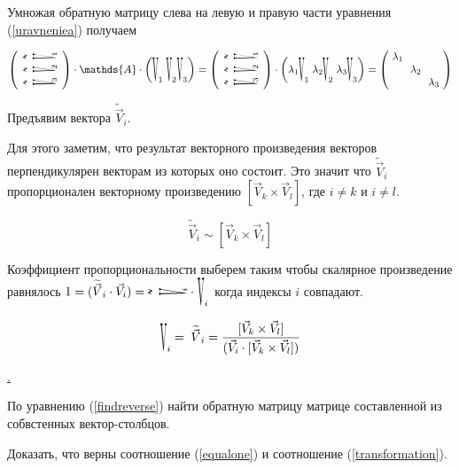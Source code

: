 \documentclass[a4paper,12pt]{article}
\begin{document}
Умножая обратную матрицу слева на левую и правую части уравнения (\ref{uravneniea}) получаем

\begin{equation}
\left(
\begin{array}{l}
        \rotatebox{90}{\raisebox{-0.25cm}{\scalebox{0.75}[3.1]{$\widetilde{V}$}$_{\!\!1}$}} \\
        \rotatebox{90}{\raisebox{-0.25cm}{\scalebox{0.75}[3.1]{$\widetilde{V}$}$_{\!\!2}$}} \\
        \rotatebox{90}{\raisebox{-0.25cm}{\scalebox{0.75}[3.1]{$\widetilde{V}$}$_{\!\!3}$}}
\end{array}
\right)
\cdot 
\mathds{A}\cdot\left(\raisebox{-0.25cm}{\scalebox{0.75}[3.1]{V}$_1$} \vectorcol{V}{2} \vectorcol{V}{3}\right) = 
\left(
\begin{array}{l}
        \rotatebox{90}{\raisebox{-0.25cm}{\scalebox{0.75}[3.1]{$\widetilde{V}$}$_{\!\!1}$}} \\
        \rotatebox{90}{\raisebox{-0.25cm}{\scalebox{0.75}[3.1]{$\widetilde{V}$}$_{\!\!2}$}} \\
        \rotatebox{90}{\raisebox{-0.25cm}{\scalebox{0.75}[3.1]{$\widetilde{V}$}$_{\!\!3}$}}
\end{array}
\right)
\cdot
\left(\lambda_1\!\!\vectorcol{V}{1}\lambda_2\!\!\vectorcol{V}{2}\lambda_3\!\!\vectorcol{V}{3}\right)
=
\left(
\begin{array}{ccc}
	\!\lambda_1\!\\
	&\!\lambda_2\!\\
	&&\!\lambda_3\!
\end{array}
\right)
	\label{transformation}
\end{equation}


Предъявим вектора $\widetilde{\vec{V}}_i$. 

Для этого заметим, что результат векторного произведения векторов перпендикулярен
векторам из которых оно состоит. Это значит что $\widetilde{\vec{V}}_i$ пропорционален векторному произведению
$[\vec{V}_k \times \vec{V}_l]$, где $i\neq k$ и $i\neq l$.


$$
\widetilde{\vec{V}}_i \sim [\vec{V}_k \times \vec{V}_l]
$$

Коэффициент пропорциональности выберем таким чтобы скалярное произведение равнялось 
$1 = (\widetilde{\vec{V}}_i\cdot \vec{V}_i) = 
\rotatebox{90}{\raisebox{-0.25cm}{\scalebox{0.75}[3.1]{$\widetilde{V}$}$_{\!\!i}$}}\;\cdot \vectorcol{V}{i}$ 
когда индексы $i$ совпадают.

\begin{equation}
\vectorcol{V}{i} \;=\;
\widetilde{\vec{V}}_i = \frac{[\vec{V}_k \times \vec{V}_l]}
{ (\vec{V}_i \cdot [\vec{V}_k \times \vec{V}_l])}
	\label{findreverse}
\end{equation}

\underline{{.}}

По уравнению (\ref{findreverse}) найти обратную матрицу матрице
составленной из собвстенных вектор-столбцов.

Доказать, что верны соотношение (\ref{equalone}) и соотношение (\ref{transformation}).  
\end{document}
